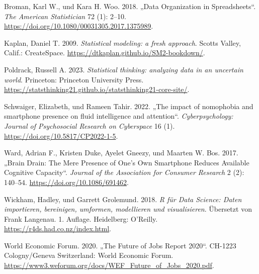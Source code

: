 \documentclass[
  a4paper,
  DIV=11]{scrreprt}
\newlength{\cslhangindent}
\newlength{\cslentryspacingunit} %
\newenvironment{CSLReferences}[2] %
 {%
  \setlength{\parindent}{0pt}
  \ifodd #1
  \let\oldpar\par
  \def\par{\hangindent=\cslhangindent\oldpar}
  \fi
  \setlength{\parskip}{#2\cslentryspacingunit}
 }%
 {}
\theoremstyle{definition}
\theoremstyle{definition}
\theoremstyle{remark}
\begin{document}
\hypertarget{refs}{}
\begin{CSLReferences}{1}{0}
\leavevmode{}%
Broman, Karl W., und Kara H. Woo. 2018. {„Data Organization in
Spreadsheets``}. \emph{The American Statistician} 72 (1): 2--10.
\url{https://doi.org/10.1080/00031305.2017.1375989}.

\leavevmode{}%
Kaplan, Daniel T. 2009. \emph{Statistical modeling: a fresh approach}.
Scotts Valley, Calif.: {CreateSpace}.
\url{https://dtkaplan.github.io/SM2-bookdown/}.

\leavevmode{}%
Poldrack, Russell A. 2023. \emph{Statistical thinking: analyzing data in
an uncertain world}. Princeton: Princeton University Press.
\url{https://statsthinking21.github.io/statsthinking21-core-site/}.

\leavevmode{}%
Schwaiger, Elizabeth, und Rameen Tahir. 2022. {„The impact of nomophobia
and smartphone presence on fluid intelligence and attention``}.
\emph{Cyberpsychology: Journal of Psychosocial Research on Cyberspace}
16 (1). \url{https://doi.org/10.5817/CP2022-1-5}.

\leavevmode{}%
Ward, Adrian F., Kristen Duke, Ayelet Gneezy, und Maarten W. Bos. 2017.
{„Brain Drain: The Mere Presence of One's Own Smartphone Reduces
Available Cognitive Capacity``}. \emph{Journal of the Association for
Consumer Research} 2 (2): 140--54. \url{https://doi.org/10.1086/691462}.

\leavevmode{}%
Wickham, Hadley, und Garrett Grolemund. 2018. \emph{R für Data Science:
Daten importieren, bereinigen, umformen, modellieren und visualisieren}.
Übersetzt von Frank Langenau. 1. Auflage. Heidelberg: O'Reilly.
\url{https://r4ds.had.co.nz/index.html}.

\leavevmode{}%
World Economic Forum. 2020. {„The Future of Jobs Report 2020``}.
{CH}-1223 Cologny/Geneva Switzerland: World Economic Forum.
\url{https://www3.weforum.org/docs/WEF_Future_of_Jobs_2020.pdf}.

\end{CSLReferences}
\end{document}
